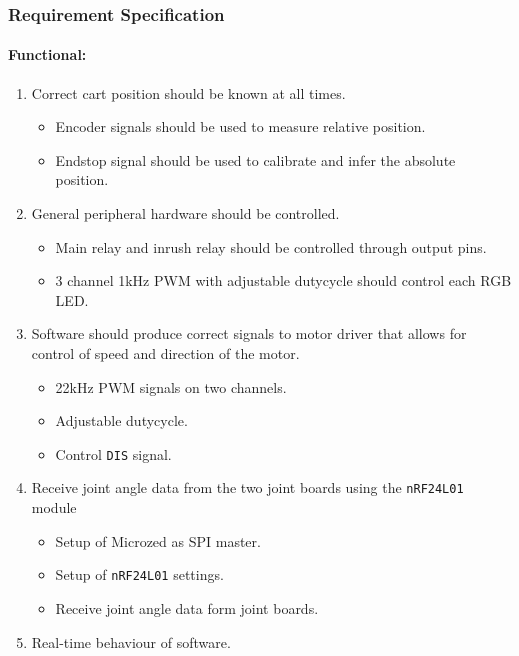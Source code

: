 \subsubsection{Requirement Specification} %
\label{ssub:controller_requirements}

\paragraph{Functional:}
\begin{enumerate}[resume]
	\item Correct cart position should be known at all times.
	\label{enum:correct_cart_position}
	\begin{itemize}
		\item Encoder signals should be used to measure relative position.
		\item Endstop signal should be used to calibrate and infer the absolute position.
	\end{itemize}
	\item General peripheral hardware should be controlled.
	\label{enum:general_peripheral_hardware}
	\begin{itemize}
		\item Main relay and inrush relay should be controlled through output pins.
		\item 3 channel 1kHz PWM with adjustable dutycycle should control each RGB LED.
	\end{itemize}
	\item Software should produce correct signals to motor driver that allows for control of speed and direction of the motor.
	\label{enum:software_correct_motor_driver_signals}
	\begin{itemize}
		\item 22kHz PWM signals on two channels.
		\item Adjustable dutycycle.
		\item Control \texttt{DIS} signal.
 	\end{itemize}
	\item Receive joint angle data from the two joint boards using the \texttt{nRF24L01} module
	\label{enum:receive_joint_angle}
	\begin{itemize}
		\item Setup of Microzed as SPI master.
		\item Setup of \texttt{nRF24L01} settings.
		\item Receive joint angle data form joint boards.
	\end{itemize}
	\item Real-time behaviour of software.
	\label{enum:real_time_behavior}
\end{enumerate}

